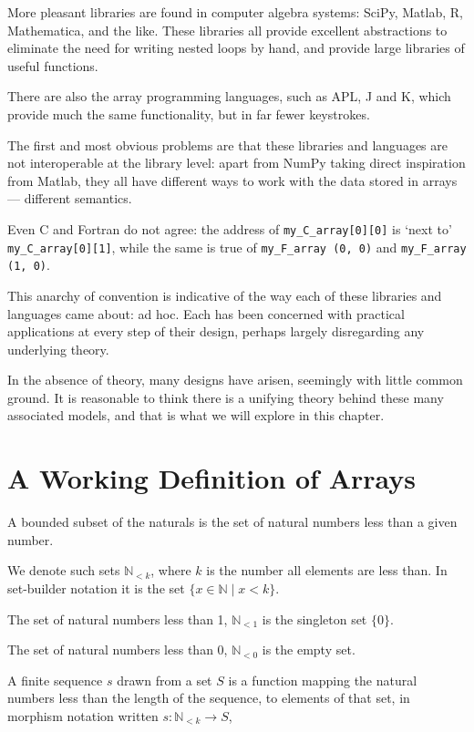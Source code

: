 \documentclass{DIKU-report-variant}
\newcommand\Nat{\mathbb{N}}
\begin{document}
More pleasant libraries are found in computer algebra systems: SciPy, Matlab,
R, Mathematica, and the like. These libraries all provide excellent abstractions 
to eliminate the need for writing nested loops by hand, and provide large libraries of useful functions.

There are also the array programming languages, such as APL, J and K, which provide
much the same functionality, but in far fewer keystrokes.

The first and most obvious problems are that these libraries and languages are not interoperable
at the library level: apart from NumPy taking direct inspiration from Matlab, they
all have different ways to work with the data stored in arrays --- different semantics.

Even C and Fortran do not agree: the address of \texttt{my\_C\_array[0][0]} is `next
to' \texttt{my\_C\_array[0][1]}, while the same is true of \texttt{my\_F\_array (0, 0)}
and \texttt{my\_F\_array (1, 0)}.

This anarchy of convention is indicative of the way each of these libraries and
languages came about: ad hoc. Each has been concerned with practical applications
at every step of their design, perhaps largely disregarding any underlying theory.

In the absence of theory, many designs have arisen, seemingly with little common
ground. It is reasonable to think there is a unifying theory behind these many associated
models, and that is what we will explore in this chapter.

\section{A Working Definition of Arrays}

\begin{definition}
  \label{def:finset}
  A bounded subset of the naturals is
  the set of natural numbers less than a given number.

  We denote such sets \(\Nat_{<k}\), where \(k\) is the number
  all elements are less than. In set-builder notation it is the set \(\{ x \in \Nat \mid x < k \}\).
  
  The set of natural numbers less than 1, \(\Nat_{<1}\) is the singleton set \(\{0\}\).

  The set of natural numbers less than 0, \(\Nat_{<0}\) is the empty set.
\end{definition}

\begin{definition}
  \label{def:finseq}
  A finite sequence \(s\) drawn from a set \(S\) is a function mapping the natural
  numbers less than the length of the sequence, to elements of that set,
  in morphism notation written \(s : \Nat_{<k} \to S\),
\end{definition}
\end{document}
